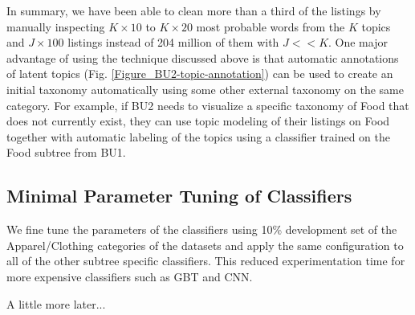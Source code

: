 In summary, we have been able to clean more than a third of the listings by manually inspecting $K\times10$ to $K\times20$ most probable words from the $K$ topics and $J\times100$ listings instead of 204 million of them with $J << K$.
One major advantage of using the technique discussed above is that automatic annotations of latent topics (Fig. \ref{Figure_BU2-topic-annotation}) can be used to create an initial taxonomy automatically using some other external taxonomy on the same category. 
For example, if BU2 needs to visualize a specific taxonomy of Food that does not currently exist, they can use topic modeling of their listings on Food together with automatic labeling of the topics using a classifier trained on the Food subtree from BU1.


\vspace{-0.2cm}
\subsection{Minimal Parameter Tuning of Classifiers}
\label{Subsect:experimental_setup>param_tuning}
\vspace{-0.2cm}

We fine tune the parameters of the classifiers using 10\% development set of the Apparel/Clothing categories of the datasets and apply the same configuration to all of the other subtree specific classifiers.
This reduced experimentation time for more expensive classifiers such as GBT and CNN.


A little more later...

\clearpage
